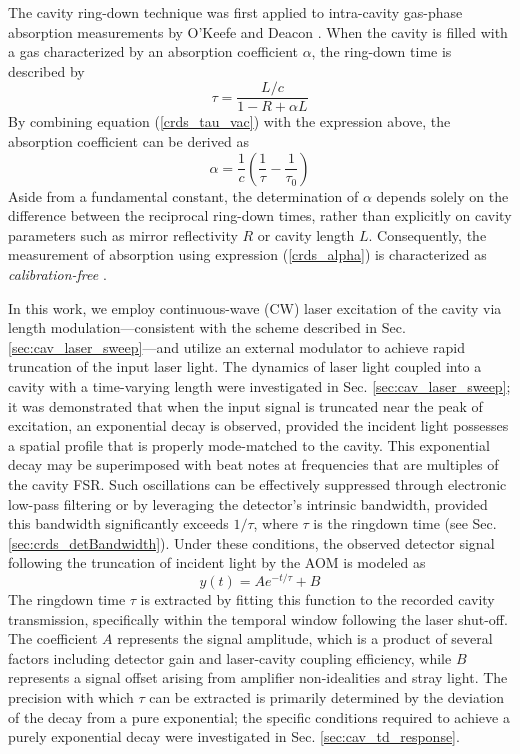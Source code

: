 \documentclass[12pt]{report}
\begin{document}
	The cavity ring-down technique was first applied to intra-cavity gas-phase absorption measurements by O'Keefe and Deacon \cite{book_crds, crds_first_okeefe}. When the cavity is filled with a gas characterized by an absorption coefficient $\alpha$, the ring-down time is described by
	\begin{equation} \label{crds_tau}
		\tau = \frac{L/c}{1-R + \alpha L}
	\end{equation}
	By combining equation (\ref{crds_tau_vac}) with the expression above, the absorption coefficient can be derived as
	\begin{equation} \label{crds_alpha}
		\alpha = \frac{1}{c}\left(\frac{1}{\tau} - \frac{1}{\tau_0}\right)
	\end{equation}
	Aside from a fundamental constant, the determination of $\alpha$ depends solely on the difference between the reciprocal ring-down times, rather than explicitly on cavity parameters such as mirror reflectivity $R$ or cavity length $L$. Consequently, the measurement of absorption using expression (\ref{crds_alpha}) is characterized as \textit{calibration-free} \cite{crds_quantitative}.
	
	In this work, we employ continuous-wave (CW) laser excitation of the cavity via length modulation—consistent with the scheme described in Sec. \ref{sec:cav_laser_sweep}—and utilize an external modulator to achieve rapid truncation of the input laser light. The dynamics of laser light coupled into a cavity with a time-varying length were investigated in Sec. \ref{sec:cav_laser_sweep}; it was demonstrated that when the input signal is truncated near the peak of excitation, an exponential decay is observed, provided the incident light possesses a spatial profile that is properly mode-matched to the cavity. This exponential decay may be superimposed with beat notes at frequencies that are multiples of the cavity FSR. Such oscillations can be effectively suppressed through electronic low-pass filtering or by leveraging the detector's intrinsic bandwidth, provided this bandwidth significantly exceeds $1/\tau$, where $\tau$ is the ringdown time (see Sec. \ref{sec:crds_detBandwidth}). Under these conditions, the observed detector signal following the truncation of incident light by the AOM is modeled as
	\begin{equation} \label{crds_model_exponential}
		y(t) = Ae^{-t/\tau} + B
	\end{equation}
	The ringdown time $\tau$ is extracted by fitting this function to the recorded cavity transmission, specifically within the temporal window following the laser shut-off. The coefficient $A$ represents the signal amplitude, which is a product of several factors including detector gain and laser-cavity coupling efficiency, while $B$ represents a signal offset arising from amplifier non-idealities and stray light. The precision with which $\tau$ can be extracted is primarily determined by the deviation of the decay from a pure exponential; the specific conditions required to achieve a purely exponential decay were investigated in Sec. \ref{sec:cav_td_response}.
	
\end{document}
